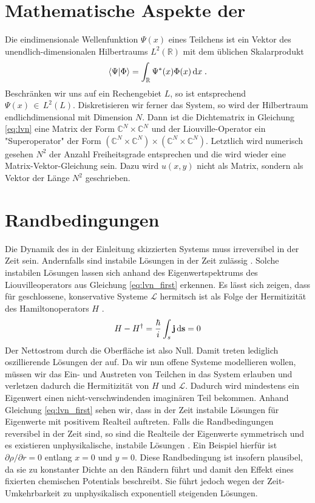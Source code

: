 \section{Mathematische Aspekte der \lvn}
Die eindimensionale Wellenfunktion $\Psi(x)$ eines Teilchens ist ein Vektor des unendlich-dimensionalen Hilbertraums $L^2(\mathbb{R})$ mit dem üblichen Skalarprodukt
\begin{align}
  \bra{\Psi}\ket{\Phi} = \int_{\mathbb{R}} \Psi^*(x)\Phi(x) \mathop{}\!\mathrm{d} x \; .
\end{align}
Beschränken wir uns auf ein Rechengebiet $L$, so ist entsprechend $\Psi(x) \,\in\,L^2(L)$. Diskretisieren wir ferner das System, so wird der Hilbertraum endlichdimensional mit Dimension $N$. Dann ist die Dichtematrix in Gleichung \eqref{eq:lvn} eine Matrix der Form $\mathbb{C}^N \times \mathbb{C}^N$ und der Liouville-Operator ein "Superoperator" \cite{frensley2} der Form $(\mathbb{C}^N \times \mathbb{C}^N)\times(\mathbb{C}^N \times \mathbb{C}^N)$. Letztlich wird numerisch gesehen $N^2$ der Anzahl Freiheitsgrade entsprechen und die \lvn wird wieder eine Matrix-Vektor-Gleichung sein. Dazu wird $u(x,y)$ nicht als Matrix, sondern als Vektor der Länge $N^2$ geschrieben.

\section{Randbedingungen}
Die Dynamik des in der Einleitung skizzierten Systems muss irreversibel in der Zeit sein. Andernfalls sind instabile Lösungen in der Zeit zulässig \cite{frensley2}. Solche instabilen Lösungen lassen sich anhand des Eigenwertspektrums des Liouvilleoperators aus Gleichung \eqref{eq:lvn_first} erkennen. Es lässt sich zeigen, dass für geschlossene, konservative Systeme $\mathcal{L}$ hermitsch ist als Folge der Hermitizität des Hamiltonoperators $H$ \cite{frensley2}.
\begin{align}
  H- H^{\dagger} = \frac{\hbar}{i}\int_s \vb{j}\mathop{}\!\mathrm{d}\vb{s} = 0
\end{align}
Der Nettostrom durch die Oberfläche ist also Null. Damit treten lediglich oszillierende Lösungen der \lvn auf. Da wir nun offene Systeme modellieren wollen, müssen wir das Ein- und Austreten von Teilchen in das System erlauben und verletzen dadurch die Hermitizität von $H$ und $\mathcal{L}$. Dadurch wird mindestens ein Eigenwert einen nicht-verschwindenden imaginären Teil bekommen. Anhand Gleichung \eqref{eq:lvn_first} sehen wir, dass in der Zeit instabile Lösungen für Eigenwerte mit positivem Realteil auftreten. Falls die Randbedingungen reversibel in der Zeit sind, so sind die Realteile der Eigenwerte symmetrisch und es existieren unphysikalische, instabile Lösungen \cite{frensley2}. Ein Beispiel hierfür ist $\partial \rho /\partial r = 0$ entlang $x=0$ und $y=0$. Diese Randbedingung ist insofern plausibel, da sie zu konstanter Dichte an den Rändern führt und damit den Effekt eines fixierten chemischen Potentials beschreibt. Sie führt jedoch wegen der Zeit-Umkehrbarkeit zu unphysikalisch exponentiell steigenden Lösungen.

